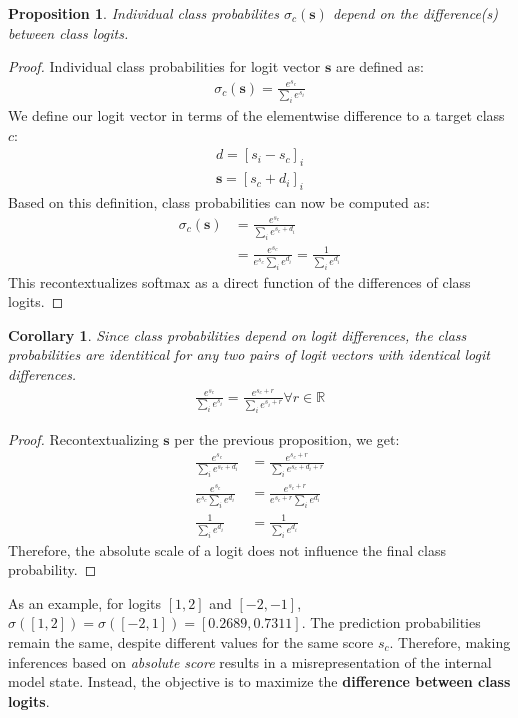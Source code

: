 \documentclass{article}
\newtheorem{theorem}{Proposition}
\newtheorem{corollary}{Corollary}[theorem]
\begin{document}
\begin{theorem}\label{classprobdiff}
	Individual class probabilites $\sigma_c(\bm{s})$ depend on the difference(s) between class logits.
\end{theorem}
\begin{proof} Individual class probabilities for logit vector $\bm{s}$ are defined as:
	\begin{gather}
		\sigma_c(\bm{s}) = \frac{e^{s_c}}{\sum_i e^{s_i}}
	\end{gather}
	We define our logit vector in terms of the elementwise difference to a target class $c$:
	\begin{gather}
		d = [s_i - s_c]_i \\
		\bm{s} = [s_c + d_i]_i
	\end{gather}
	Based on this definition, class probabilities can now be computed as:
	\begin{align}
		\sigma_c(\bm{s}) &= \frac{e^{s_c}}{\sum_i e^{s_c+d_i}} \\
				 &= \frac{e^{s_c}}{e^{s_c} \sum_i e^{d_i}} = \frac{1}{\sum_i e^{d_i}}
	\end{align}
	This recontextualizes softmax as a direct function of the differences of class logits.
\end{proof}
\begin{corollary} Since class probabilities depend on logit differences, the class probabilities are identitical for any two pairs of logit vectors with identical logit differences.
	\begin{gather}
		\frac{e^{s_c}}{\sum_i e^{s_i}} = \frac{e^{s_c+r}}{\sum_i e^{s_i+r}} \forall r \in \mathbb{R}
	\end{gather}
\end{corollary}
\begin{proof} Recontextualizing $\bm{s}$ per the previous proposition, we get:
	\begin{align}
		\frac{e^{s_c}}{\sum_i e^{s_c + d_i}} &= \frac{e^{s_c+r}}{\sum_i e^{s_c+d_i+r}} \\
		\frac{e^{s_c}}{e^{s_c}\sum_i e^{d_i}} &= \frac{e^{s_c+r}}{e^{s_c + r} \sum_i e^{d_i}} \\
		\frac{1}{\sum_i e^{d_i}} &= \frac{1}{\sum_i e^{d_i}}
	\end{align}
	Therefore, the absolute scale of a logit does not influence the final class probability.
\end{proof}

As an example, for logits $[1,2]$ and $[-2,-1]$, $\sigma([1,2]) = \sigma([-2,1]) = [0.2689, 0.7311]$. The prediction probabilities remain the same, despite different values for the same score $s_c$. Therefore, making inferences based on \textit{absolute score} results in a misrepresentation of the internal model state. Instead, the objective is to maximize the \textbf{difference between class logits}.
\end{document}
